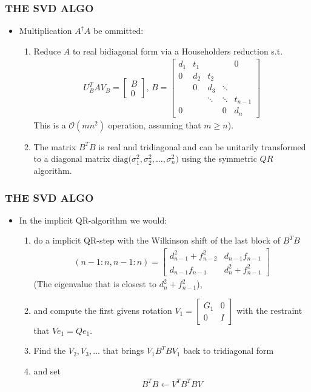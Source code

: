 \documentclass[a4paper,8pt]{beamer} %
\newcommand{\diag}[1]{\text{diag}{#1}}
\newcommand{\smatrix}[1]{\left[\begin{matrix} #1 \end{matrix}\right]}
\begin{document}
\begin{frame}%
	\frametitle{THE SVD ALGO}
	\begin{itemize}
		\item <1-> Multiplication $A^\dagger A$ be ommitted:
			\begin{enumerate}
				\item Reduce $A$ to real bidiagonal form via a Householders reduction s.t. 
					\begin{align}
						U_B^T A V_B = \smatrix{B\\0} ,\, B = 
						\smatrix{
							d_1 & t_1 & & & 0\\
							0 & d_2 & t_2 & & \\
							& 0 & d_3 & \ddots & \\
							& & \ddots	& \ddots & t_{n-1} \\
							0& & & 0& d_n 
						}
					\end{align}
					This is a $\mathcal O(mn^2)$ operation, assuming that $m\ge n$).
		\item <2-> The matrix $B^TB$ is real and tridiagonal and can be unitarily transformed to a diagonal matrix 
						$\diag (\sigma_1^2, \sigma_2^2,\dots, \sigma_n^2)$ using the symmetric $QR$ algorithm.
			\end{enumerate}
	\end{itemize}
\end{frame}%
\begin{frame}%
\frametitle{THE SVD ALGO}
\begin{itemize}
	\item In the implicit QR-algorithm we would:
		\begin{enumerate}
			\item
				do a implicit QR-step with the Wilkinson shift of the last block of $B^TB$
				\begin{align}
					[B^TB](n-1:n,n-1:n) = \smatrix{d^2_{n-1}+f^2_{n-2} & d_{n-1}f_{n-1} \\ d_{n-1}f_{n-1} & d^2_n+f^2_{n-1}}
				\end{align}
				(The eigenvalue that is closest to $d^2_n+f^2_{n-1}$), 
			\item and compute the first givens rotation $V_1=\smatrix{G_1 & 0 \\ 0 & I}$ with the restraint that $Ve_1=Qe_1$.
			\item Find the $V_2,V_3,\dots$ that brings $V_1B^TBV_1$ back to tridiagonal form 
			\item and set
				\begin{align}
					B^TB \gets V^TB^TBV
				\end{align}
		\end{enumerate}
\end{itemize}
\end{frame}%
\end{document}
